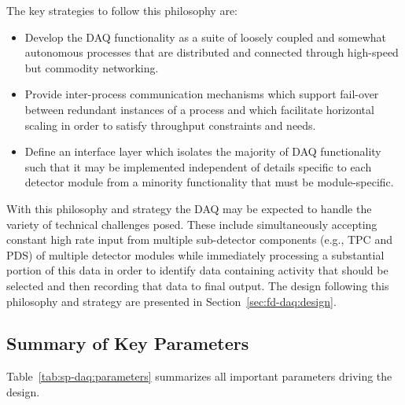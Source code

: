 The key strategies to follow this philosophy are:
\begin{itemize}
\item Develop the DAQ functionality as a suite of loosely coupled and somewhat autonomous processes that are distributed and connected through high-speed but commodity networking.
\item Provide inter-process communication mechanisms which support
  fail-over between redundant instances of a process and which
  facilitate horizontal scaling in order to satisfy throughput
  constraints and needs.
\item Define an interface layer which isolates the majority of DAQ functionality such that it may be implemented independent of details specific to each detector module from a minority functionality that must be module-specific.
\end{itemize}

With this philosophy and strategy the DAQ may be expected to handle the variety of technical challenges posed. 
These include simultaneously accepting constant high rate input from multiple sub-detector components (e.g., TPC and PDS) of multiple detector modules while immediately processing a substantial portion of this data in order to identify data containing activity that should be selected and then recording that data to final output.
The design following this philosophy and strategy are presented in Section~\ref{sec:fd-daq:design}.


\subsection{Summary of Key Parameters}
\label{sec:sp-daq:parameters}

Table~\ref{tab:sp-daq:parameters} summarizes all important parameters
driving the  design.


